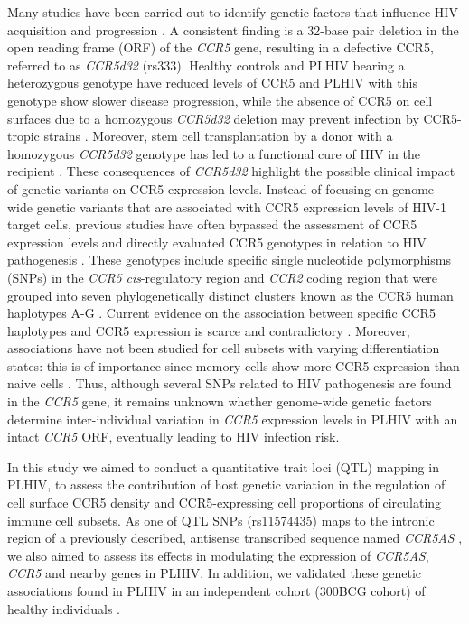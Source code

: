 \documentclass{book}
\begin{document}
\begin{refsection}
Many studies have been carried out to identify genetic factors that influence HIV acquisition and progression \cite{Brelot2018CCR5}.
A consistent finding is a 32-base pair deletion in the open reading frame (ORF) of the \textit{CCR5} gene, resulting in a defective CCR5, referred to as \textit{CCR5d32} (rs333).
Healthy controls and PLHIV bearing a heterozygous genotype have reduced levels of CCR5 and PLHIV with this genotype show slower disease progression, while the absence of CCR5 on cell surfaces due to a homozygous \textit{CCR5d32} deletion may prevent infection by CCR5-tropic strains \cite{Liu1996Homozygous}.
Moreover, stem cell transplantation by a donor with a homozygous \textit{CCR5d32} genotype has led to a functional cure of HIV in the recipient \cite{Hütter2009Long}.
These consequences of \textit{CCR5d32} highlight the possible clinical impact of genetic variants on CCR5 expression levels.
Instead of focusing on genome-wide genetic variants that are associated with CCR5 expression levels of HIV-1 target cells, previous studies have often bypassed the assessment of CCR5 expression levels and directly evaluated CCR5 genotypes in relation to HIV pathogenesis \cite{Gonzalez1999Race,Mangano2001Concordance}.
These genotypes include specific single nucleotide polymorphisms (SNPs) in the \textit{CCR5} \textit{cis}-regulatory region and \textit{CCR2} coding region that were grouped into seven phylogenetically distinct clusters known as the CCR5 human haplotypes A-G \cite{Gonzalez1999Race}.
Current evidence on the association between specific CCR5 haplotypes and CCR5 expression is scarce and contradictory \cite{Jaumdally2017CCR5,Picton2012CCR5}.
Moreover, associations have not been studied for cell subsets with varying differentiation states: this is of importance since memory cells show more CCR5 expression than naive cells \cite{Gornalusse2015Epigenetic}.
Thus, although several SNPs related to HIV pathogenesis are found in the \textit{CCR5} gene, it remains unknown whether genome-wide genetic factors determine inter-individual variation in \textit{CCR5} expression levels in PLHIV with an intact \textit{CCR5} ORF, eventually leading to HIV infection risk.

In this study we aimed to conduct a quantitative trait loci (QTL) mapping in PLHIV, to assess the contribution of host genetic variation in the regulation of cell surface CCR5 density and CCR5-expressing cell proportions of circulating immune cell subsets.
As one of QTL SNPs (rs11574435) maps to the intronic region of a previously described, antisense transcribed sequence named \textit{CCR5AS} \cite{Kulkarni2019CCR5AS}, we also aimed to assess its effects in modulating the expression of \textit{CCR5AS}, \textit{CCR5} and nearby genes in PLHIV.
In addition, we validated these genetic associations found in PLHIV in an independent cohort (300BCG cohort) of healthy individuals \cite{Koeken2020BCG}.



\end{refsection}
\end{document}

